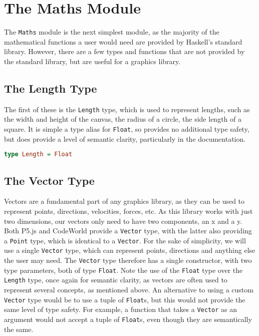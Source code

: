 \documentclass[../main.tex]{subfiles}
\begin{document}
    \section{The Maths Module}
        The \verb|Maths| module is the next simplest module, as the majority of the
            mathematical functions a user would need are provided by Haskell's standard
            library.
        However, there are a few types and functions that are not provided by the
            standard library, but are useful for a graphics library.

        \subsection{The Length Type}
            The first of these is the \verb|Length| type, which is used to represent
                lengths, such as the width and height of the canvas, the radius of a circle,
                the side length of a square.
            It is simple a type alias for \verb|Float|, so provides no additional type
                safety, but does provide a level of semantic clarity, particularly in the
                documentation.
            \begin{lstlisting}[language=Haskell, label={lst:length}, caption={The Length type definition.}]
type Length = Float\end{lstlisting}

        \subsection{The Vector Type}
            Vectors are a fundamental part of any graphics library, as they can be used to
                represent points, directions, velocities, forces, etc. As this library works
                with just two dimensions, our vectors only need to have two components, an x
                and a y.
            Both P5.js and CodeWorld provide a \verb|Vector| type, with the latter also
                providing a \verb|Point| type, which is identical to a \verb|Vector|.
            For the sake of simplicity, we will use a single \verb|Vector| type, which can
                represent points, directions and anything else the user may need.
            The \verb|Vector| type therefore has a single constructor, with two type
                parameters, both of type \verb|Float|.
            Note the use of the \verb|Float| type over the \verb|Length| type, once again
                for semantic clarity, as vectors are often used to represent several concepts,
                as mentioned above.
            An alternative to using a custom \verb|Vector| type would be to use a tuple of
                \verb|Float|s, but this would not provide the same level of type safety.
            For example, a function that takes a \verb|Vector| as an argument would not
                accept a tuple of \verb|Float|s, even though they are semantically the same.
\end{document}
